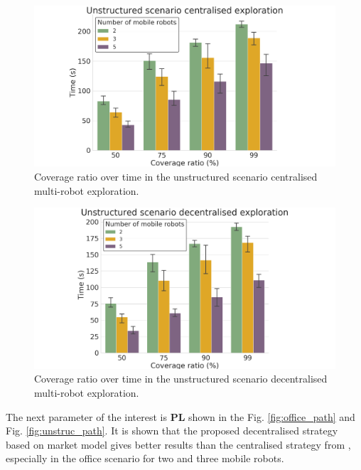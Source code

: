 \documentclass[letterpaper, 10 pt, conference]{ieeeconf}  %
\begin{document}
\begin{figure}[h!]
	\centering\includegraphics[width=0.9\columnwidth]{unstructured_coverage_cent.png}
	\caption{Coverage ratio over time in the unstructured scenario centralised multi-robot exploration.}
	\label{fig:unstruc_cent}
\end{figure}

\begin{figure}[h!]
	\centering\includegraphics[width=0.9\columnwidth]{unstructured_coverage_decent.png}
	\caption{Coverage ratio over time in the unstructured scenario decentralised multi-robot exploration.}
	\label{fig:unstruc_decent}
\end{figure}

The next parameter of the interest is \textbf{PL} shown in the Fig. \ref{fig:office_path} and Fig. \ref{fig:unstruc_path}. It is shown that the proposed decentralised strategy based on market model gives better results than the centralised strategy from \cite{burgard}, especially in the office scenario for two and three mobile robots. 
\end{document}
